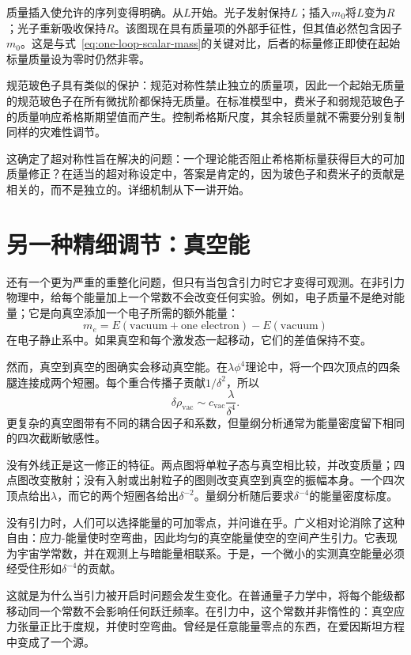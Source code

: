 质量插入使允许的序列变得明确。从\(L\)开始。光子发射保持\(L\)；插入\(m_0\)将\(L\)变为\(R\)；光子重新吸收保持\(R\)。该图现在具有质量项的外部手征性，但其值必然包含因子\(m_0\)。这是与式~\eqref{eq:one-loop-scalar-mass}的关键对比，后者的标量修正即使在起始标量质量设为零时仍然非零。

规范玻色子具有类似的保护：规范对称性禁止独立的质量项，因此一个起始无质量的规范玻色子在所有微扰阶都保持无质量。在标准模型中，费米子和弱规范玻色子的质量响应希格斯期望值而产生。控制希格斯尺度，其余轻质量就不需要分别复制同样的灾难性调节。

这确定了超对称性旨在解决的问题：一个理论能否阻止希格斯标量获得巨大的可加质量修正？在适当的超对称设定中，答案是肯定的，因为玻色子和费米子的贡献是相关的，而不是独立的。详细机制从下一讲开始。

\section{另一种精细调节：真空能}

还有一个更为严重的重整化问题，但只有当包含引力时它才变得可观测。在非引力物理中，给每个能量加上一个常数不会改变任何实验。例如，电子质量不是绝对能量；它是向真空添加一个电子所需的额外能量：
\begin{equation}
m_e=E(\text{vacuum}+\text{one electron})-E(\text{vacuum})
\end{equation}
在电子静止系中。如果真空和每个激发态一起移动，它们的差值保持不变。

然而，真空到真空的图确实会移动真空能。在\(\lambda\phi^4\)理论中，将一个四次顶点的四条腿连接成两个短圈。每个重合传播子贡献\(1/\delta^2\)，所以
\begin{equation}
\delta\rho_{\mathrm{vac}}
\sim
c_{\mathrm{vac}}\frac{\lambda}{\delta^4}.
\label{eq:vacuum-energy-divergence}
\end{equation}
更复杂的真空图带有不同的耦合因子和系数，但量纲分析通常为能量密度留下相同的四次截断敏感性。

没有外线正是这一修正的特征。两点图将单粒子态与真空相比较，并改变质量；四点图改变散射；没有入射或出射粒子的图则改变真空到真空的振幅本身。一个四次顶点给出\(\lambda\)，而它的两个短圈各给出\(\delta^{-2}\)。量纲分析随后要求\(\delta^{-4}\)的能量密度标度。

没有引力时，人们可以选择能量的可加零点，并问谁在乎。广义相对论消除了这种自由：应力-能量使时空弯曲，因此均匀的真空能量使空的空间产生引力。它表现为宇宙学常数，并在观测上与暗能量相联系。于是，一个微小的实测真空能量必须经受住形如\(\delta^{-4}\)的贡献。

这就是为什么当引力被开启时问题会发生变化。在普通量子力学中，将每个能级都移动同一个常数不会影响任何跃迁频率。在引力中，这个常数并非惰性的：真空应力张量正比于度规，并使时空弯曲。曾经是任意能量零点的东西，在爱因斯坦方程中变成了一个源。

